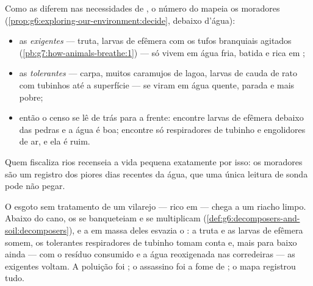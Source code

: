 \begin{proposition}\label{prop:g7:oxygen-in-the-water:map}
Como as  diferem nas necessidades de , o número do
 mapeia os moradores
(\cref{prop:g6:exploring-our-environment:decide}, debaixo d'água):
\begin{itemize}
  \item as  \emph{exigentes} --- truta, larvas de efêmera com
        os tufos branquiais agitados
        (\cref{pb:g7:how-animals-breathe:1}) --- só vivem em água
        fria, batida e rica em ;
  \item as  \emph{tolerantes} --- carpa, muitos caramujos de
        lagoa, larvas de cauda de rato com tubinhos até a superfície
        --- se viram em água quente, parada e mais pobre;
  \item então o censo se lê de trás para a frente: encontre larvas de
        efêmera debaixo das pedras e a água é boa; encontre só
        respiradores de tubinho e engolidores de ar, e ela é ruim.
\end{itemize}
Quem fiscaliza rios recenseia a vida pequena exatamente por isso: os
moradores são um registro dos piores dias recentes da água, que uma
única leitura de sonda pode não pegar.
\end{proposition}
\admitted

\begin{example}\label{ex:g7:oxygen-in-the-water:waste}
O esgoto sem tratamento de um vilarejo --- rico em  ---
chega a um riacho limpo. Abaixo do cano, os  se
banqueteiam e se multiplicam
(\cref{def:g6:decomposers-and-soil:decomposers}), e a  em
massa deles esvazia o : a truta e as larvas de efêmera somem,
os tolerantes respiradores de tubinho tomam conta e, mais para baixo
ainda --- com o resíduo consumido e a água reoxigenada nas corredeiras
--- as  exigentes voltam. A poluição foi ; o
assassino foi a fome de ; o mapa registrou tudo.
\end{example}


